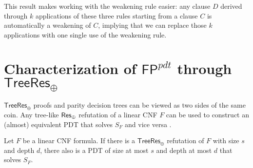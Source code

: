 This result makes working with the weakening rule easier: any clause $D$ derived through $k$ applications of these three rules starting from a clause $C$ is automatically a weakening of $C$, implying that we can replace those $k$ applications with one single use of the weakening rule.

\section{Characterization of $\textsf{FP}^{pdt}$ through $\mathsf{TreeRes}_\oplus$}

$\mathsf{TreeRes}_\oplus$ proofs and parity decision trees can be viewed as two sides of the same coin. Any tree-like $\mathsf{Res_\oplus}$ refutation of a linear CNF $F$ can be used to construct an (almost) equivalent PDT that solves $S_F$ and vice versa \cite{res_lin_2}.

\begin{lemma}
    \label{resp_to_pdt}
 Let $F$ be a linear CNF formula. If there is a $\mathsf{TreeRes}_\oplus$ refutation of $F$ with size $s$ and depth $d$, there also is a PDT of size at most $s$ and depth at most $d$ that solves $S_F$.
\end{lemma}

